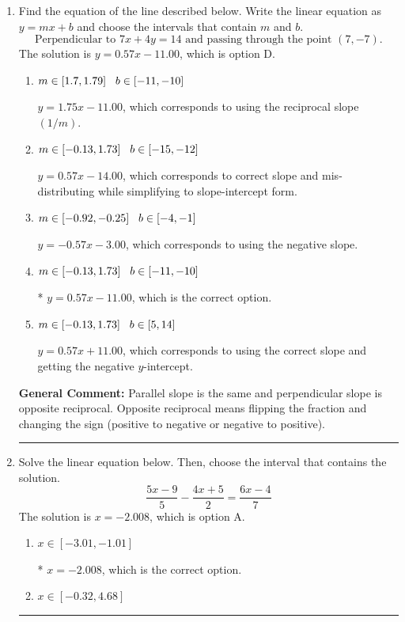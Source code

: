\documentclass{extbook}[14pt]
\newcommand{\litem}[1]{\item #1

\rule{\textwidth}{0.4pt}}
\begin{document}
\begin{enumerate}\litem{
Find the equation of the line described below. Write the linear equation as $ y=mx+b $ and choose the intervals that contain $m$ and $b$.
\[ \text{Perpendicular to } 7 x + 4 y = 14 \text{ and passing through the point } (7, -7). \]
The solution is \( y = 0.57x - 11.00 \), which is option D.\begin{enumerate}[label=\Alph*.]
\item \( m \in [1.7, 1.79] \hspace*{3mm} b \in [-11, -10] \)

 $y = 1.75x - 11.00$, which corresponds to using the reciprocal slope $(1/m)$.
\item \( m \in [-0.13, 1.73] \hspace*{3mm} b \in [-15, -12] \)

 $y = 0.57x - 14.00$, which corresponds to correct slope and mis-distributing while simplifying to slope-intercept form.
\item \( m \in [-0.92, -0.25] \hspace*{3mm} b \in [-4, -1] \)

 $y = -0.57x - 3.00$, which corresponds to using the negative slope.
\item \( m \in [-0.13, 1.73] \hspace*{3mm} b \in [-11, -10] \)

* $y = 0.57x - 11.00$, which is the correct option.
\item \( m \in [-0.13, 1.73] \hspace*{3mm} b \in [5, 14] \)

 $y = 0.57x + 11.00$, which corresponds to using the correct slope and getting the negative $y$-intercept.
\end{enumerate}

\textbf{General Comment:} Parallel slope is the same and perpendicular slope is opposite reciprocal. Opposite reciprocal means flipping the fraction and changing the sign (positive to negative or negative to positive).
}
\litem{
Solve the linear equation below. Then, choose the interval that contains the solution.
\[ \frac{5x -9}{5} - \frac{4x + 5}{2} = \frac{6x -4}{7} \]
The solution is \( x = -2.008 \), which is option A.\begin{enumerate}[label=\Alph*.]
\item \( x \in [-3.01, -1.01] \)

* $x = -2.008$, which is the correct option.
\item \( x \in [-0.32, 4.68] \)


\end{enumerate}}
\end{enumerate}
\end{document}
